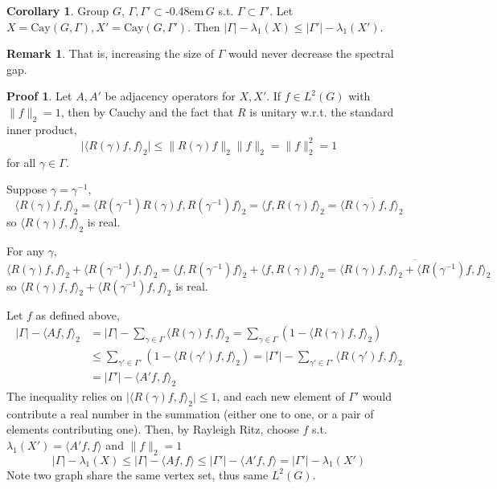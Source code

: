 \documentclass{book}
\newcommand{\syin}{$\subset$\kern-0.48em\raisebox{.20ex}{\tiny S}$\,$}
\newcommand{\inner}[1]{\langle #1 \rangle}
\newcommand{\norm}[1]{\lVert #1 \rVert}
\newcommand{\abs}[1]{\lvert #1 \rvert }
\newcommand{\Cay}[1]{\textrm{Cay}( #1 )}
\theoremstyle{definition}
\newtheorem{corollary}[lemma]{Corollary}
\theoremstyle{remarkstyle}
\newtheorem*{remark}{Remark}%
\newtheorem*{myproof}{Proof}%
\begin{document}
\begin{corollary}
    Group $G$, $\Gamma,\Gamma'$\syin$G$ s.t. $\Gamma\subset\Gamma'$. Let $X=\Cay{G,\Gamma},X'=\Cay{G,\Gamma'}$. Then $\abs{\Gamma}-\lambda_1(X)\le \abs{\Gamma'}-\lambda_1(X')$.
\end{corollary}
\begin{remark}
    That is, increasing the size of $\Gamma$ would never decrease the spectral gap.
\end{remark}
\begin{myproof}
    Let $A,A'$ be adjacency operators for $X,X'$. If $f\in L^2(G)$ with $\norm{f}_2=1$, then by Cauchy and the fact that $R$ is unitary w.r.t. the standard inner product,
    $$
    \abs{\inner{R(\gamma)f,f}_2}\le \norm{R(\gamma)f}_2\norm{f}_2 = \norm{f}_2^2 = 1
    $$
    for all $\gamma\in\Gamma$. \newline 

    Suppose $\gamma=\gamma^{-1} $, 
    $$
    \inner{R(\gamma)f,f}_2=\inner{R(\gamma^{-1})R(\gamma)f,R(\gamma^{-1})f}_2 = \inner{f,R(\gamma)f}_2 = \overline{\inner{R(\gamma)f,f}_2} 
    $$
    so $\inner{R(\gamma)f,f}_2$ is real. \newline
    
    For any $\gamma$, 
    $$
    \inner{R(\gamma)f,f}_2 + \inner{R(\gamma^{-1})f,f}_2 = \inner{f,R(\gamma^{-1})f}_2 + \inner{f,R(\gamma)f}_2 = \overline{\inner{R(\gamma)f,f}_2 + \inner{R(\gamma^{-1})f,f}_2}
    $$
    so $\inner{R(\gamma)f,f}_2 + \inner{R(\gamma^{-1})f,f}_2$ is real. \newline 

    Let $f$ as defined above, 
    \begin{align*}
        \abs{\Gamma}-\inner{Af,f}_2 
        &= \abs{\Gamma} - \sum_{\gamma\in\Gamma}\inner{R(\gamma)f,f}_2 = \sum_{\gamma\in\Gamma}(1-\inner{R(\gamma)f,f}_2) \\
        &\le \sum_{\gamma'\in\Gamma'}(1-\inner{R(\gamma')f,f}_2) = \abs{\Gamma'} - \sum_{\gamma'\in\Gamma'}\inner{R(\gamma')f,f}_2 \\
        &= \abs{\Gamma'}-\inner{A'f,f}_2
    \end{align*}
    The inequality relies on $\abs{\inner{R(\gamma)f,f}_2}\le1$, and each new element of $\Gamma'$ would contribute a real number in the summation (either one to one, or a pair of elements contributing one). Then, by Rayleigh Ritz, choose $f$ s.t. $\lambda_1(X')=\inner{A'f,f}$ and $\norm{f}_2=1$ 
    $$
    \abs{\Gamma}-\lambda_1(X) \le \abs{\Gamma}-\inner{Af,f} \le \abs{\Gamma'}-\inner{A'f,f} = \abs{\Gamma'}-\lambda_1(X')
    $$
    Note two graph share the same vertex set, thus same $L^2(G)$. \newline
\end{myproof}
\end{document}
